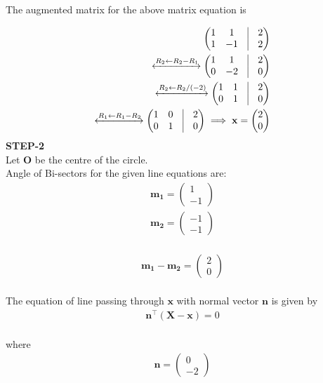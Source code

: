 \documentclass[10pt,a4paper]{report}
\newcommand{\myvec}[1]{\ensuremath{\begin{pmatrix}#1\end{pmatrix}}}
\let\vec\mathbf
\let\vec\mathbf
\begin{document}
\begin{multicols}{2}
		    The augmented matrix for the above matrix equation is 
		   
		   \begin{align}
			    \myvec{
				    1 & 1 & \vrule & 2
			    \\
			    1 & -1  &\vrule & 2
		    }
		    \\
		    \xleftrightarrow[]{R_2 \leftarrow R_2 -R_1 }
			    \myvec{
				    1 & 1 & \vrule & 2
			    \\
			    0 & -2  &\vrule & 0
		    }
		    \\
		    \xleftrightarrow[]{R_2 \leftarrow R_2 /(-2) }
			    \myvec{
				    1 & 1 & \vrule & 2
			    \\
			    0 & 1  &\vrule & 0
		    }
		      \\
		    \xleftrightarrow[]{R_1 \leftarrow R_1 -R_2 }
			    \myvec{
				    1 & 0 & \vrule & 2
			    \\
			    0 & 1  &\vrule & 0
		    }
			    \implies \vec{x} = \myvec{2 \\ 0}
		    \end{align}
 \textbf{STEP-2}\vspace{2mm}\\
Let $\vec{O}$ be the centre of the circle.\\
 \vspace{2mm}
Angle of Bi-sectors for the given line equations are:\\
\begin{align}
\vec{m_1}=\myvec{1\\
-1}
\end{align} 
\begin{align}
\vec{m_2}=\myvec{-1\\
-1}
\end{align} \\
\begin{align}
\vec{m_1}-\vec{m_2}=\myvec{2\\
0}
\end{align} \\
The equation of line passing through $\vec{x}$ with normal vector $\vec{n}$ is given by\\
\begin{align}
  \label{eq:line_norm_eq2}
\vec{n}^{\top} (\vec{X-x})=0
\end{align}\\
where 
\begin{align}
  \label{eq:line_norm_eq3}
\vec{n}=\myvec{0\\
-2}
\end{align} \\

\end{multicols}
\end{document}
